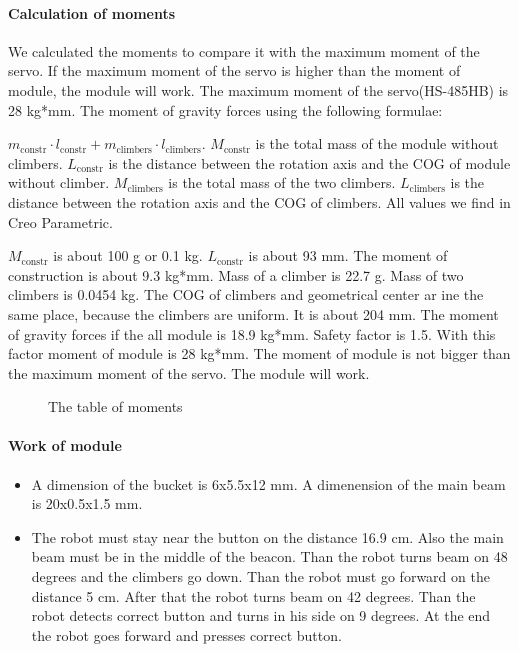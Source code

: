 	\paragraph{Calculation of moments}
	
	We calculated the moments to compare it with the maximum moment of the servo. If the maximum moment of the servo is higher than the moment of module, the module will work. The maximum moment of the servo(HS-485HB) is 28 kg*mm. The moment of gravity forces using the following formulae: 
	
	$m_\text{constr} \cdot l_\text{constr} + m_\text{climbers} \cdot l_\text{climbers}$.	
	 $M_\text{constr}$ is the total mass of the module without climbers. $L_\text{constr}$ is the distance between the rotation axis and the COG of module without climber. $M_\text{climbers}$ is the total mass of the two climbers. $L_\text{climbers}$ is the distance between the rotation axis and the COG of climbers. All values we find in Creo Parametric.
	 
	 $M_\text{constr}$ is about 100 g or 0.1 kg. $L_\text{constr}$ is about 93 mm. The moment of construction is about 9.3 kg*mm. Mass of a climber is 22.7 g. Mass of two climbers is 0.0454 kg. The COG of climbers and geometrical center ar ine the same place, because the climbers are uniform. It is about 204 mm. The moment of gravity forces if the all module is 18.9 kg*mm. Safety factor is 1.5. With this factor moment of module is 28 kg*mm. The moment of module is not bigger than the maximum moment of the servo. The module will work.
	 \begin{figure}[H]
	 	\begin{minipage}[h]{\linewidth}
	 		\caption{The table of moments}
	 	\end{minipage}
	 \end{figure}
	 
	 \paragraph{Work of module}
	 
	 \begin{itemize}
	 
		 \item A dimension of the bucket is 6x5.5x12 mm. A dimenension of the main beam is 20x0.5x1.5 mm.
	 
		 \item The robot must stay near the button on the distance 16.9 cm. Also the main beam must be in the middle of the beacon. Than the robot turns beam on 48 degrees and the climbers go down. Than the robot must go forward on the distance 5 cm. After that the robot turns beam on 42 degrees. Than the robot detects correct button and turns in his side on 9 degrees. At the end the robot goes forward and presses correct button.
	\end{itemize}
	\fillpage